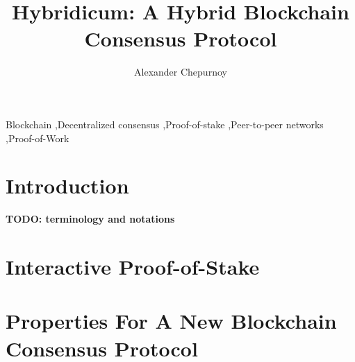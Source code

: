 \documentclass[number,preprint,review]{elsarticle}
\begin{document}
\begin{frontmatter}



\title{Hybridicum: A Hybrid Blockchain Consensus Protocol}



\author{Alexander Chepurnoy}

\address{}

\begin{abstract}

\end{abstract}

\begin{keyword}
Blockchain \sep Decentralized consensus \sep Proof-of-stake \sep Peer-to-peer networks \sep Proof-of-Work
\end{keyword}

\end{frontmatter}


\section{Introduction}
\label{intr_section}




\textbf{TODO: terminology and notations}


\section{Interactive Proof-of-Stake}



\section{Properties For A New Blockchain Consensus Protocol}
\end{document}
